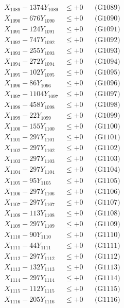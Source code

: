 \documentclass[a4paper,10pt]{article}
\begin{document}
{\begin{align}
X_{1089} - 1374Y_{1089} &\leq +0 && \text{(G1089)} \\
X_{1090} - 676Y_{1090} &\leq +0 && \text{(G1090)} \\
\allowbreak
X_{1091} - 124Y_{1091} &\leq +0 && \text{(G1091)} \\
X_{1092} - 747Y_{1092} &\leq +0 && \text{(G1092)} \\
X_{1093} - 255Y_{1093} &\leq +0 && \text{(G1093)} \\
X_{1094} - 272Y_{1094} &\leq +0 && \text{(G1094)} \\
X_{1095} - 102Y_{1095} &\leq +0 && \text{(G1095)} \\
X_{1096} - 86Y_{1096} &\leq +0 && \text{(G1096)} \\
X_{1097} - 1104Y_{1097} &\leq +0 && \text{(G1097)} \\
X_{1098} - 458Y_{1098} &\leq +0 && \text{(G1098)} \\
X_{1099} - 22Y_{1099} &\leq +0 && \text{(G1099)} \\
X_{1100} - 155Y_{1100} &\leq +0 && \text{(G1100)} \\
\allowbreak
X_{1101} - 297Y_{1101} &\leq +0 && \text{(G1101)} \\
X_{1102} - 297Y_{1102} &\leq +0 && \text{(G1102)} \\
X_{1103} - 297Y_{1103} &\leq +0 && \text{(G1103)} \\
X_{1104} - 297Y_{1104} &\leq +0 && \text{(G1104)} \\
X_{1105} - 95Y_{1105} &\leq +0 && \text{(G1105)} \\
X_{1106} - 297Y_{1106} &\leq +0 && \text{(G1106)} \\
X_{1107} - 297Y_{1107} &\leq +0 && \text{(G1107)} \\
X_{1108} - 113Y_{1108} &\leq +0 && \text{(G1108)} \\
X_{1109} - 297Y_{1109} &\leq +0 && \text{(G1109)} \\
X_{1110} - 90Y_{1110} &\leq +0 && \text{(G1110)} \\
\allowbreak
X_{1111} - 44Y_{1111} &\leq +0 && \text{(G1111)} \\
X_{1112} - 297Y_{1112} &\leq +0 && \text{(G1112)} \\
X_{1113} - 132Y_{1113} &\leq +0 && \text{(G1113)} \\
X_{1114} - 297Y_{1114} &\leq +0 && \text{(G1114)} \\
X_{1115} - 112Y_{1115} &\leq +0 && \text{(G1115)} \\
X_{1116} - 205Y_{1116} &\leq +0 && \text{(G1116)} \\

\end{align}}
\end{document}
